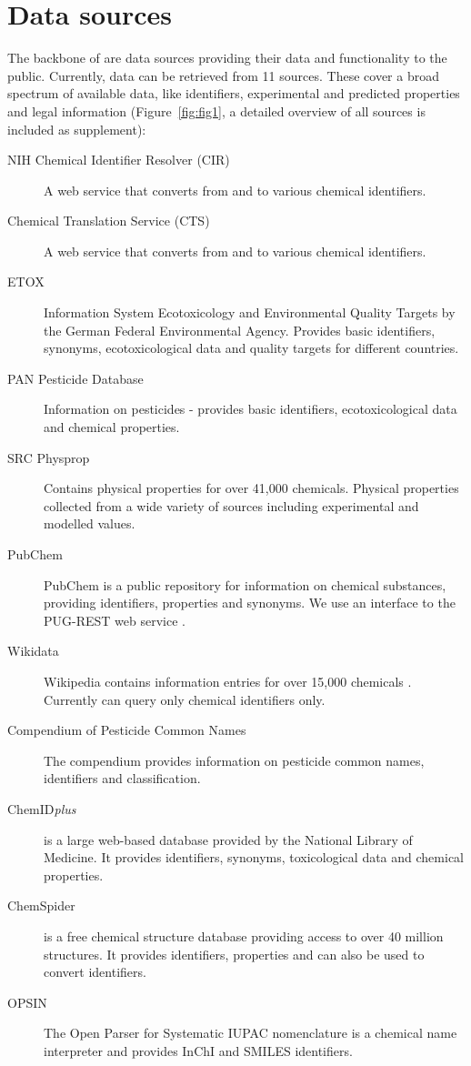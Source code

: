 \documentclass[article, shortnames]{jss}\usepackage[]{graphicx}\usepackage[]{color}
\begin{document}
\section[Data sources]{Data sources}
The backbone of  are data sources providing their data and functionality to the public.
Currently, data can be retrieved from 11 sources.
These cover a broad spectrum of available data, like identifiers, experimental and predicted properties and legal information (Figure~\ref{fig:fig1}, a detailed overview of all sources is included as supplement):

\begin{description}
  \item[NIH Chemical Identifier Resolver (CIR) \citep{cir}]{A web service that converts from and to various chemical identifiers.}
  \item[Chemical Translation Service (CTS) \citep{Wohlgemuth_Haldiya_Willighagen_Kind_Fiehn_2010}]{A web service that converts from and to various chemical identifiers.}
  \item[ETOX \citep{etox}]{Information System Ecotoxicology and Environmental Quality Targets by the German Federal Environmental Agency. Provides basic identifiers, synonyms, ecotoxicological data and quality targets for different countries.}
  \item[PAN Pesticide Database \citep{pan}]{Information on pesticides - provides basic identifiers, ecotoxicological data and chemical properties.}
  \item[SRC Physprop \citep{physprop}]{Contains physical properties for over 41,000 chemicals.
  Physical properties collected from a wide variety of sources including experimental and modelled values.}
  \item[PubChem \citep{Kim_2016}]{PubChem is a public repository for information on chemical substances, providing identifiers, properties and synonyms.
  We use an interface to the PUG-REST web service \citep{Kim_Thiessen_Bolton_Bryant_2015}.}
  \item[Wikidata \citep{wiki}]{Wikipedia contains information entries for over 15,000 chemicals \citep{Ertl_Patiny_Sander_Rufener_Zasso_2015}. Currently  can query only chemical identifiers only.}
  \item[Compendium of Pesticide Common Names \citep{wood}]{The compendium provides information on pesticide common names, identifiers and classification.}
  \item[ChemID\emph{plus} \citep{Tomasulo_2002}]{is a large web-based database provided by the National Library of Medicine. It provides identifiers, synonyms, toxicological data and chemical properties.}
  \item[ChemSpider \citep{pence_chemspider:_2010}]{is a free chemical structure database providing access to over 40 million structures. It provides identifiers, properties and can also be used to convert identifiers.}
  \item[OPSIN  \citep{Lowe_Corbett_Murray-Rust_Glen_2011}]{The Open Parser for Systematic IUPAC nomenclature is a chemical name interpreter and provides InChI and SMILES identifiers.}
\end{description}
\end{document}
